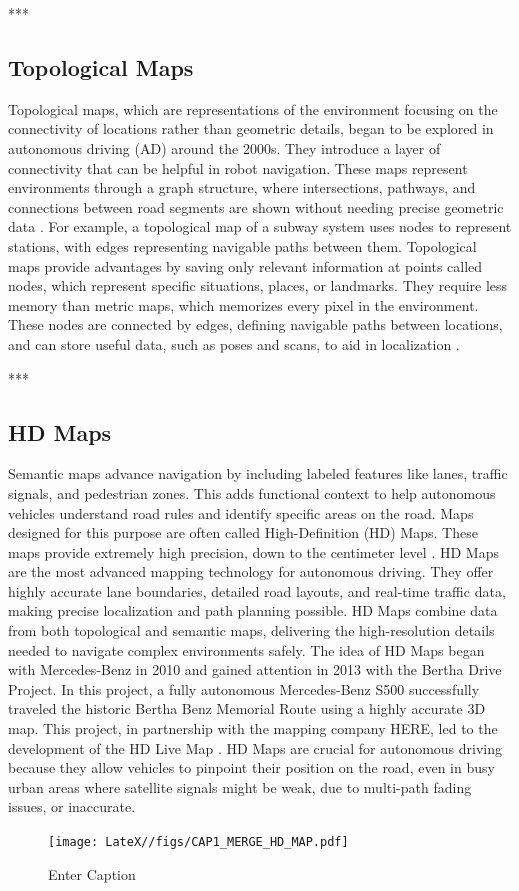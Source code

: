 ***

\subsection{Topological Maps}
Topological maps, which are representations of the environment focusing on the connectivity of locations rather than geometric details, began to be explored in autonomous driving (AD) around the 2000s. They introduce a layer of connectivity that can be helpful in robot navigation. These maps represent environments through a graph structure, where intersections, pathways, and connections between road segments are shown without needing precise geometric data \cite{li2020survey}. For example, a topological map of a subway system uses nodes to represent stations, with edges representing navigable paths between them. \cite{8105770}
Topological maps provide advantages by saving only relevant information at points called nodes, which represent specific situations, places, or landmarks. They require less memory than metric maps, which memorizes every pixel in the environment. These nodes are connected by edges, defining navigable paths between locations, and can store useful data, such as poses and scans, to aid in localization \cite{murciego2021topological}.

***

\subsection{HD Maps}
Semantic maps advance navigation by including labeled features like lanes, traffic signals, and pedestrian zones. This adds functional context to help autonomous vehicles understand road rules and identify specific areas on the road. Maps designed for this purpose are often called High-Definition (HD) Maps. These maps provide extremely high precision, down to the centimeter level \cite{geospatialworld_hd_maps}.
HD Maps are the most advanced mapping technology for autonomous driving. They offer highly accurate lane boundaries, detailed road layouts, and real-time traffic data, making precise localization and path planning possible. HD Maps combine data from both topological and semantic maps, delivering the high-resolution details needed to navigate complex environments safely.
The idea of HD Maps began with Mercedes-Benz in 2010 and gained attention in 2013 with the Bertha Drive Project. In this project, a fully autonomous Mercedes-Benz S500 successfully traveled the historic Bertha Benz Memorial Route using a highly accurate 3D map. This project, in partnership with the mapping company HERE, led to the development of the HD Live Map \cite{8105770}.
HD Maps are crucial for autonomous driving because they allow vehicles to pinpoint their position on the road, even in busy urban areas where satellite signals might be weak, due to multi-path fading issues, or inaccurate.
\begin{figure}[H]
    \centering
    \texttt{[image: LateX//figs/CAP1\_MERGE\_HD\_MAP.pdf]}
    \caption{Enter Caption}
    \label{fig:enter-label}
\end{figure}

